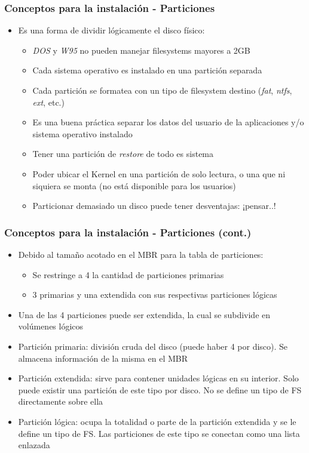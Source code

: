 \begin{frame}
	\frametitle{Conceptos para la instalación - Particiones}
	\begin{itemize}
		\item Es una forma de dividir lógicamente el disco físico:
		\begin{itemize}
			\item \emph{DOS} y \emph{W95} no pueden manejar filesystems mayores a 2GB
			\item Cada sistema operativo es instalado en una partición separada
			\item Cada partición se formatea con un tipo de filesystem destino (\textit{fat}, \textit{ntfs}, \textit{ext}, etc.)
			\item Es una buena práctica separar los datos del usuario de la aplicaciones y/o sistema operativo instalado
			\item Tener una partición de \emph{restore} de todo es sistema
			\item Poder ubicar el Kernel en una partición de solo lectura, o una que ni siquiera se monta (no está disponible para los usuarios)
			\item Particionar demasiado un disco puede tener desventajas: ¡pensar..!
		\end{itemize}
	\end{itemize}
\end{frame}

\begin{frame}
	\frametitle{Conceptos para la instalación - Particiones (cont.)}
	\begin{itemize}
		\item Debido al tamaño acotado en el MBR para la tabla de particiones:
		\begin{itemize}
			\item Se restringe a 4 la cantidad de particiones primarias
			\item 3 primarias y una extendida con sus respectivas particiones lógicas
		\end{itemize}
		\item Una de las 4 particiones puede ser extendida, la cual se subdivide en volúmenes lógicos
		\item Partición primaria: división cruda del disco (puede haber 4 por disco). Se almacena información de la misma en el MBR
		\item Partición extendida: sirve para contener unidades lógicas en su interior. Solo puede existir una partición de este tipo por disco. No se define un tipo de FS directamente sobre ella
		\item Partición lógica: ocupa la totalidad o parte de la partición extendida y se le define un tipo de FS. Las particiones de este tipo se conectan como una lista enlazada
	\end{itemize}
\end{frame}

